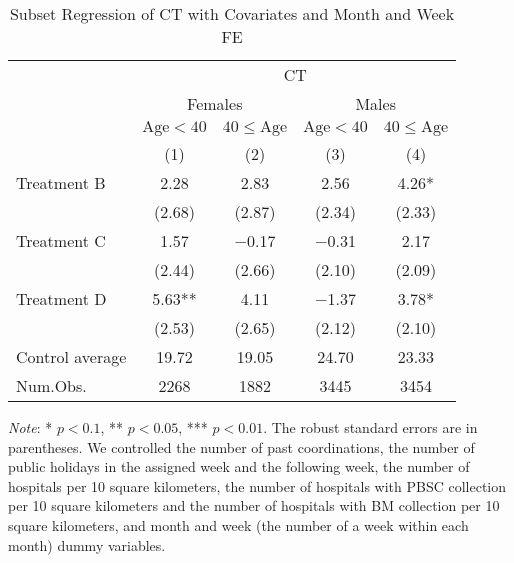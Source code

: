 \documentclass[12pt, a4paper]{article}
\begin{document}
\begin{table}[H]

\caption{\label{tab:test-lm-subset2}Subset Regression of CT with Covariates and Month and Week FE}
\centering
\fontsize{8}{10}\selectfont
\begin{threeparttable}
\begin{tabular}[t]{lcccc}
\toprule
\multicolumn{1}{c}{ } & \multicolumn{4}{c}{CT} \\
\cmidrule(l{3pt}r{3pt}){2-5}
\multicolumn{1}{c}{ } & \multicolumn{2}{c}{Females} & \multicolumn{2}{c}{Males} \\
\cmidrule(l{3pt}r{3pt}){2-3} \cmidrule(l{3pt}r{3pt}){4-5}
\multicolumn{1}{c}{ } & \multicolumn{1}{c}{$\text{Age} < 40$} & \multicolumn{1}{c}{$40 \le \text{Age}$} & \multicolumn{1}{c}{$\text{Age} < 40$} & \multicolumn{1}{c}{$40 \le \text{Age}$} \\
\cmidrule(l{3pt}r{3pt}){2-2} \cmidrule(l{3pt}r{3pt}){3-3} \cmidrule(l{3pt}r{3pt}){4-4} \cmidrule(l{3pt}r{3pt}){5-5}
  & (1) & (2) & (3) & (4)\\
\midrule
Treatment B & \num{2.28} & \num{2.83} & \num{2.56} & \num{4.26}*\\
 & (\num{2.68}) & (\num{2.87}) & (\num{2.34}) & (\num{2.33})\\
Treatment C & \num{1.57} & \num{-0.17} & \num{-0.31} & \num{2.17}\\
 & (\num{2.44}) & (\num{2.66}) & (\num{2.10}) & (\num{2.09})\\
Treatment D & \num{5.63}** & \num{4.11} & \num{-1.37} & \num{3.78}*\\
 & (\num{2.53}) & (\num{2.65}) & (\num{2.12}) & (\num{2.10})\\
\midrule
Control average & 19.72 & 19.05 & 24.70 & 23.33\\
Num.Obs. & \num{2268} & \num{1882} & \num{3445} & \num{3454}\\
\bottomrule
\end{tabular}
\begin{tablenotes}
\item \emph{Note}: * $p < 0.1$, ** $p < 0.05$, *** $p < 0.01$. The robust standard errors are in parentheses. We controlled the number of past coordinations, the number of public holidays in the assigned week and the following week, the number of hospitals per 10 square kilometers, the number of hospitals with PBSC collection per 10 square kilometers and the number of hospitals with BM collection per 10 square kilometers, and month and week (the number of a week within each month) dummy variables.
\end{tablenotes}
\end{threeparttable}
\end{table}
\end{document}
